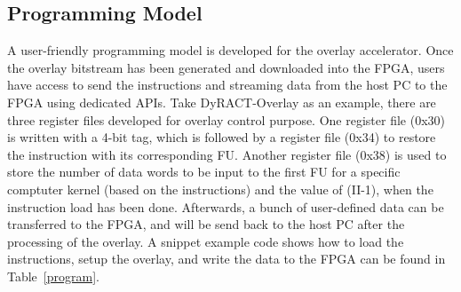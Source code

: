 \subsection{Programming Model}
A user-friendly programming model is developed for the overlay accelerator. 
Once the overlay bitstream has been generated and downloaded into the FPGA, users have access to send the instructions and streaming data from the host PC to the FPGA using dedicated APIs. 
Take DyRACT-Overlay as an example, there are three register files developed for overlay control purpose. 
One register file (0x30) is written with a 4-bit tag, which is followed by a register file (0x34) to restore the instruction with its corresponding FU. 
Another register file (0x38) is used to store the number of data words to be input to the first FU for a specific comptuter kernel (based on the instructions) and the value of (II-1), when the instruction load has been done. 
Afterwards, a bunch of user-defined data can be transferred to the FPGA, and will be send back to the host PC after the processing of the overlay. 
A snippet example code shows how to load the instructions, setup the overlay, and write the data to the FPGA can be found in Table~\ref{program}. 


